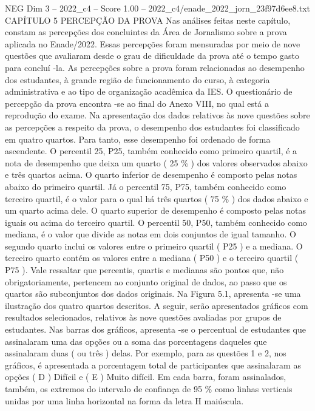 \begin{textsample}{NEG Dim 3 – 2022\_c4 – Score 1.00 – 2022\_c4/enade\_2022\_jorn\_23f97d6ee8.txt}  \label{ex:f3_neg_147}
CAPÍTULO 5 PERCEPÇÃO DA PROVA Nas análises feitas neste capítulo, constam as percepções dos concluintes da Área de Jornalismo sobre a prova aplicada no Enade/2022.
Essas percepções foram mensuradas por meio de nove questões que avaliaram desde o grau de dificuldade da prova até o tempo gasto para concluí -la.
As percepções sobre a prova foram relacionadas ao desempenho dos estudantes, à grande região de funcionamento do curso, à categoria administrativa e ao tipo de organização acadêmica da IES.
O questionário de percepção da prova encontra -se ao final do Anexo VIII, no qual está a reprodução do exame.
Na apresentação dos dados relativos às nove questões sobre as percepções a respeito da prova, o desempenho dos estudantes foi classificado em quatro quartos.
Para tanto, esse desempenho foi ordenado de forma ascendente.
O percentil 25, P25, também conhecido como primeiro quartil, é a nota de desempenho que deixa um quarto ( 25 \% ) dos valores observados abaixo e três quartos acima.
O quarto inferior de desempenho é composto pelas notas abaixo do primeiro quartil.
Já o percentil 75, P75, também conhecido como terceiro quartil, é o valor para o qual há três quartos ( 75 \% ) dos dados abaixo e um quarto acima dele.
O quarto superior de desempenho é composto pelas notas iguais ou acima do terceiro quartil.
O percentil 50, P50, também conhecido como mediana, é o valor que divide as notas em dois conjuntos de igual tamanho.
O segundo quarto inclui os valores entre o primeiro quartil ( P25 ) e a mediana.
O terceiro quarto contém os valores entre a mediana ( P50 ) e o terceiro quartil ( P75 ).
Vale ressaltar que percentis, quartis e medianas são pontos que, não obrigatoriamente, pertencem ao conjunto original de dados, ao passo que os quartos são subconjuntos dos dados originais.
Na Figura 5.1, apresenta -se uma ilustração dos quatro quartos descritos.
A seguir, serão apresentados gráficos com resultados selecionados, relativos às nove questões avaliadas por grupos de estudantes.
Nas barras dos gráficos, apresenta -se o percentual de estudantes que assinalaram uma das opções ou a soma das porcentagens daqueles que assinalaram duas ( ou três ) delas.
Por exemplo, para as questões 1 e 2, nos gráficos, é apresentada a porcentagem total de participantes que assinalaram as opções ( D ) Difícil e ( E ) Muito difícil.
Em cada barra, foram assinalados, também, os extremos do intervalo de confiança de 95 \% como linhas verticais unidas por uma linha horizontal na forma da letra H maiúscula.

\end{textsample}
